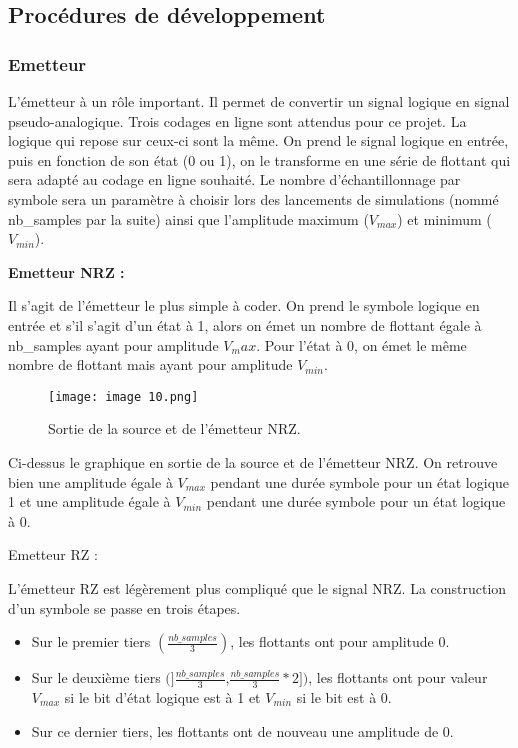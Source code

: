 \subsection{Procédures de développement}
\subsubsection{Emetteur}

L'émetteur à un rôle important. Il permet de convertir un signal logique en signal pseudo-analogique. Trois codages en ligne sont attendus pour ce projet. La logique qui repose sur ceux-ci sont la même. On prend le signal logique en entrée, puis en fonction de son état (0 ou 1), on le transforme en une série de flottant qui sera adapté au codage en ligne souhaité. Le nombre d'échantillonnage par symbole sera un paramètre à choisir lors des lancements de simulations (nommé nb\_samples par la suite) ainsi que l'amplitude maximum ($V_{max}$) et minimum ($V_{min}$).

\textbf{Emetteur NRZ :}

Il s'agit de l'émetteur le plus simple à coder. On prend le symbole logique en entrée et s'il s'agit d'un état à 1, alors on émet un nombre de flottant égale à nb\_samples ayant pour amplitude $V_max$. Pour l'état à 0, on émet le même nombre de flottant mais ayant pour amplitude $V_{min}$.

\begin{figure}[H]
    \centering
    \texttt{[image: image 10.png]}
    \caption{\label{fig:image10}Sortie de la source et de l'émetteur NRZ.}
\end{figure}

Ci-dessus le graphique en sortie de la source et de l'émetteur NRZ. On retrouve bien une amplitude égale à $V_{max}$ pendant une durée symbole pour un état logique 1 et une amplitude égale à $V_{min}$ pendant une durée symbole pour un état logique à 0.

Emetteur RZ :

L'émetteur RZ est légèrement plus compliqué que le signal NRZ. La construction d'un symbole se passe en trois étapes.

\begin{itemize}
    \item Sur le premier tiers $(\frac{nb\_samples}{3})$, les flottants ont pour amplitude 0.
    \item Sur le deuxième tiers $(]\frac{nb\_samples}{3}$,$\frac{nb\_samples}{3}*2])$, les flottants ont pour valeur $V_{max}$ si le bit d'état logique est à 1 et $V_{min}$ si le bit est à 0.
    \item Sur ce dernier tiers, les flottants ont de nouveau une amplitude de 0.
\end{itemize}

